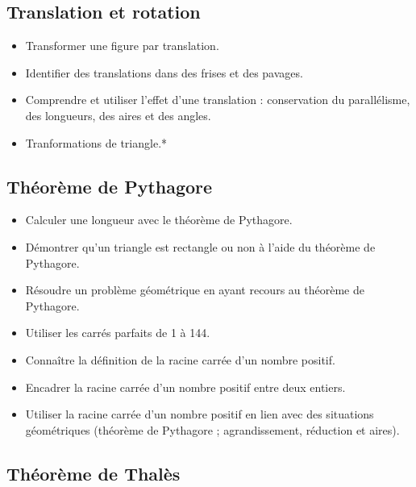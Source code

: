 \documentclass[a4paper,12pt,fleqn]{article}	
\begin{document}
\renewcommand{\labelitemi}{}

\subsection*{Translation et rotation}

\begin{itemize}
	\item {}Transformer une figure par translation.
	\item {}Identifier des translations dans des frises et des pavages.
	\item {}Comprendre et utiliser l’effet d’une translation : conservation du parallélisme, des longueurs, des aires et des angles.
	\item {}Tranformations de triangle.*
\end{itemize}

\subsection*{Théorème de Pythagore}

\begin{itemize}
	\item {}Calculer une longueur avec le théorème de Pythagore.
	\item {}Démontrer qu'un triangle est rectangle ou non à l'aide du théorème de Pythagore.
	\item {}Résoudre un problème géométrique en ayant recours au théorème de Pythagore.
	\item {}Utiliser les carrés parfaits de 1 à 144.
	\item {}Connaître la définition de la racine carrée d’un nombre positif.
	\item {}Encadrer la racine carrée d’un nombre positif entre deux entiers.%
	\item {}Utiliser la racine carrée d’un nombre positif en lien avec des situations géométriques (théorème de Pythagore ; agrandissement, réduction et aires).
\end{itemize}

\subsection*{Théorème de Thalès}
\end{document}
